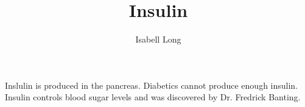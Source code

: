 \documentclass{article}
\begin{document}
\title{Insulin}
\author{Isabell Long}
\maketitle

Inslulin is produced in the pancreas.  Diabetics cannot produce enough insulin.  Insulin controls blood sugar levels and was discovered by Dr. Fredrick Banting.
\end{document}
